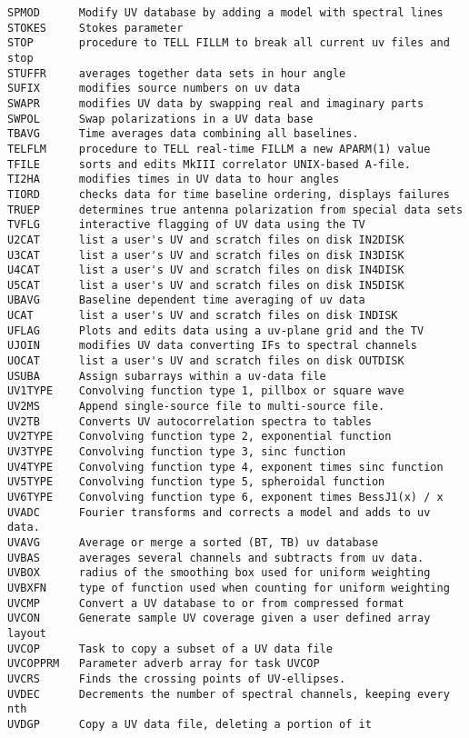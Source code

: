 \begin{verbatim}
SPMOD      Modify UV database by adding a model with spectral lines
STOKES     Stokes parameter
STOP       procedure to TELL FILLM to break all current uv files and stop
STUFFR     averages together data sets in hour angle
SUFIX      modifies source numbers on uv data
SWAPR      modifies UV data by swapping real and imaginary parts
SWPOL      Swap polarizations in a UV data base
TBAVG      Time averages data combining all baselines.
TELFLM     procedure to TELL real-time FILLM a new APARM(1) value
TFILE      sorts and edits MkIII correlator UNIX-based A-file.
TI2HA      modifies times in UV data to hour angles
TIORD      checks data for time baseline ordering, displays failures
TRUEP      determines true antenna polarization from special data sets
TVFLG      interactive flagging of UV data using the TV
U2CAT      list a user's UV and scratch files on disk IN2DISK
U3CAT      list a user's UV and scratch files on disk IN3DISK
U4CAT      list a user's UV and scratch files on disk IN4DISK
U5CAT      list a user's UV and scratch files on disk IN5DISK
UBAVG      Baseline dependent time averaging of uv data
UCAT       list a user's UV and scratch files on disk INDISK
UFLAG      Plots and edits data using a uv-plane grid and the TV
UJOIN      modifies UV data converting IFs to spectral channels
UOCAT      list a user's UV and scratch files on disk OUTDISK
USUBA      Assign subarrays within a uv-data file
UV1TYPE    Convolving function type 1, pillbox or square wave
UV2MS      Append single-source file to multi-source file.
UV2TB      Converts UV autocorrelation spectra to tables
UV2TYPE    Convolving function type 2, exponential function
UV3TYPE    Convolving function type 3, sinc function
UV4TYPE    Convolving function type 4, exponent times sinc function
UV5TYPE    Convolving function type 5, spheroidal function
UV6TYPE    Convolving function type 6, exponent times BessJ1(x) / x
UVADC      Fourier transforms and corrects a model and adds to uv data.
UVAVG      Average or merge a sorted (BT, TB) uv database
UVBAS      averages several channels and subtracts from uv data.
UVBOX      radius of the smoothing box used for uniform weighting
UVBXFN     type of function used when counting for uniform weighting
UVCMP      Convert a UV database to or from compressed format
UVCON      Generate sample UV coverage given a user defined array layout
UVCOP      Task to copy a subset of a UV data file
UVCOPPRM   Parameter adverb array for task UVCOP
UVCRS      Finds the crossing points of UV-ellipses.
UVDEC      Decrements the number of spectral channels, keeping every nth
UVDGP      Copy a UV data file, deleting a portion of it

\end{verbatim}
